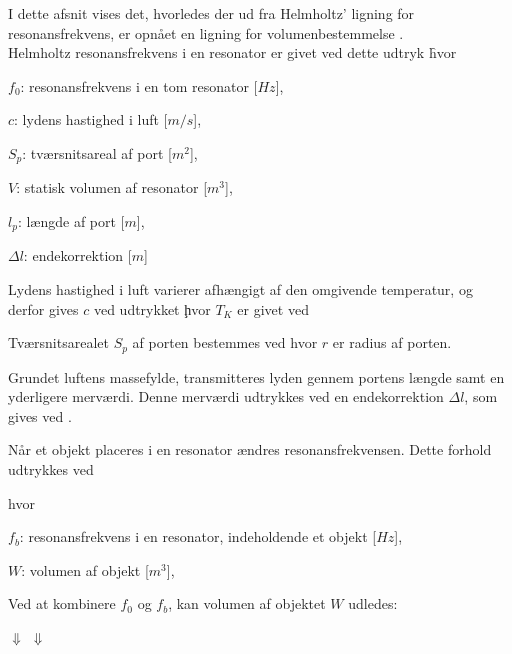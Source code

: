 I dette afsnit vises det, hvorledes der ud fra Helmholtz' ligning for resonansfrekvens, er opnået en ligning for volumenbestemmelse \citep{Refworks:22}. \\
 Helmholtz resonansfrekvens i en resonator er givet ved dette udtryk \f

hvor 
\begin{description}[align=left,labelindent=0.3cm]
\item $f_{0}$: resonansfrekvens i en tom resonator [$Hz$],\\
\item $c$: lydens hastighed i luft [$m/s$],\\
\item $S_{p}$: tværsnitsareal af port [$m^2$],\\
\item $V$: statisk volumen af resonator [$m^3$],\\
\item $l_{p}$: længde af port [$m$],\\
\item $\Delta l$: endekorrektion [$m$]\\
\end{description}

Lydens hastighed i luft varierer afhængigt af den omgivende temperatur, og derfor gives $c$ ved udtrykket \c 

hvor $T_{K}$ er givet ved \T

Tværsnitsarealet $S_{p}$ af porten bestemmes ved \Sp 
hvor ${r}$ er radius af porten. 

Grundet luftens massefylde, transmitteres lyden gennem portens længde samt en yderligere merværdi. Denne merværdi udtrykkes ved en endekorrektion $\Delta l$, som gives ved \deltal. 

Når et objekt placeres i en resonator ændres resonansfrekvensen. Dette forhold udtrykkes ved \fb

hvor 
\begin{description}[align=left,labelindent=0.3cm]
\item $f_{b}$: resonansfrekvens i en resonator, indeholdende et objekt [$Hz$],\\
\item $W$: volumen af objekt [$m^3$],\\
\end{description}

Ved at kombinere $f_{0}$ og $f_{b}$, kan volumen af objektet $W$ udledes: 

\Wudl
$\Downarrow$
\Wudled
$\Downarrow$
\W
\vspace{5mm}  

